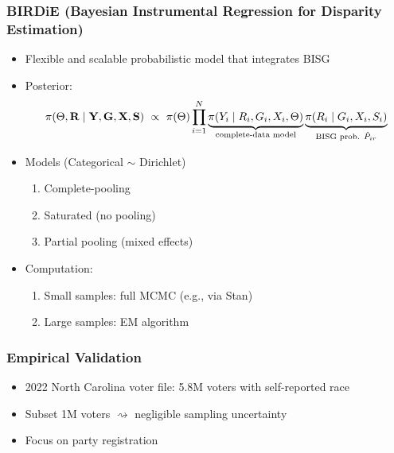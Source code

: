 \documentclass{beamer}
\begin{document}
\begin{frame}

  \frametitle{BIRDiE {\small (Bayesian Instrumental Regression for Disparity
    Estimation)}}

\begin{itemize}
\item Flexible and scalable probabilistic model that integrates BISG 

\item Posterior:
    $$\pi(\Theta, \vb R\mid \vb Y, \vb G, \vb X, \vb S)
    \ \propto \ \pi(\Theta)\prod_{i=1}^N \underbrace{\pi(Y_i\mid R_i,
      G_i, X_i, \Theta)}_{\text{complete-data model}}
            \underbrace{\pi(R_i\mid G_i, X_i, S_i)}_{\text{BISG prob. } \hat{P}_{ir}}$$
\item Models (Categorical $\sim$ Dirichlet) 
  \begin{enumerate}
  \item Complete-pooling
  \item Saturated (no pooling)
  \item Partial pooling (mixed effects)
  \end{enumerate}

  \vfill
\item Computation:
  \begin{enumerate}
  \item Small samples: full MCMC (e.g., via Stan)
  \item Large samples: EM algorithm
  \end{enumerate}
  
\end{itemize}

\end{frame}

\begin{frame}

  \frametitle{Empirical Validation}

  \begin{itemize}
  \item 2022 North Carolina voter file: 5.8M voters with
    self-reported race
  \item Subset 1M voters $\rightsquigarrow$ negligible sampling
    uncertainty

    \vfill
  \item Focus on party registration

  \end{itemize}

\end{frame}
\end{document}
